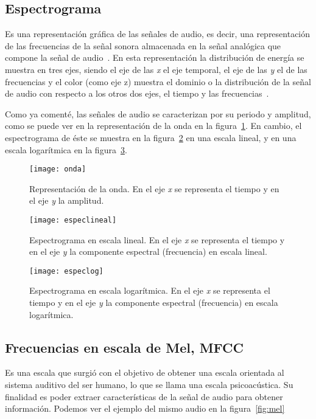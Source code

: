 \subsection{Espectrograma}
Es una representación gráfica de las señales de audio, es decir, una representación de las frecuencias de la señal sonora almacenada en la señal analógica que compone la señal de audio~\cite{wiki:espec}. En esta representación la distribución de energía se muestra en tres ejes, siendo el eje de las \textit{x} el eje temporal, el eje de las \textit{y} el de las frecuencias y el color (como eje z) muestra el dominio o la distribución de la señal de audio con respecto a los otros dos ejes, el tiempo y las frecuencias~\cite{granesp}.

Como ya comenté, las señales de audio se caracterizan por su periodo y amplitud, como se puede ver en la representación de la onda en la figura~\ref{fig:onda}. En cambio, el espectrograma de éste se muestra en la figura~\ref{fig:espec} en una escala lineal, y en una escala logarítmica en la figura~\ref{fig:especlog}.
\begin{figure}
	\centering
	\texttt{[image: onda]}
	\caption{Representación de la onda. En el eje \textit{x} se representa el tiempo y en el eje \textit{y} la amplitud.}
	\label{fig:onda}
\end{figure}
\begin{figure}
	\centering
	\texttt{[image: especlineal]}
	\caption{Espectrograma en escala lineal. En el eje \textit{x} se representa el tiempo y en el eje \textit{y} la componente espectral (frecuencia) en escala lineal.}
	\label{fig:espec}
\end{figure}
\begin{figure}
	\centering
	\texttt{[image: especlog]}
	\caption{Espectrograma en escala logarítmica. En el eje \textit{x} se representa el tiempo y en el eje \textit{y} la componente espectral (frecuencia) en escala logarítmica.}
	\label{fig:especlog}
\end{figure}
\subsection{Frecuencias en escala de Mel, MFCC} \label{mel}
Es una escala que surgió con el objetivo de obtener una escala orientada al sistema auditivo del ser humano, lo que se llama una escala psicoacústica. Su finalidad es poder extraer características de la señal de audio para obtener información. Podemos ver el ejemplo del mismo audio en la figura~\ref{fig:mel}


